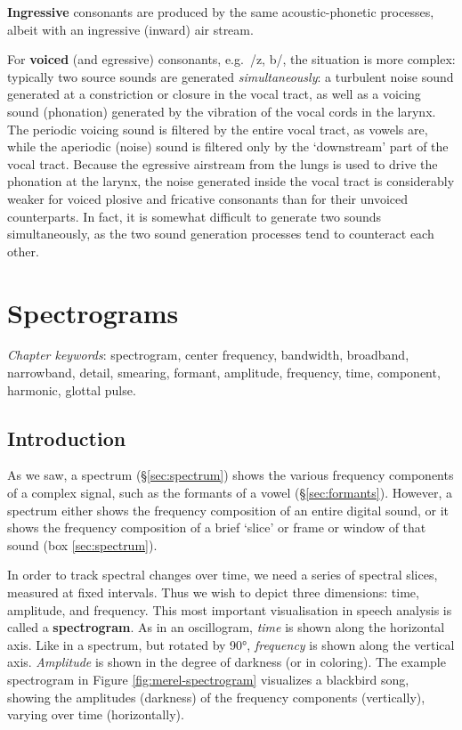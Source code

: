 \documentclass[
]{book}
\begin{document}
\textbf{Ingressive} consonants are produced by the same acoustic-phonetic processes, albeit with an ingressive (inward) air stream.

For \textbf{voiced} (and egressive) consonants, e.g.~/z, b/, the situation is more complex: typically two source sounds are generated \emph{simultaneously}: a turbulent noise sound generated at a constriction or closure in the vocal tract, as well as a voicing sound (phonation) generated by the vibration of the vocal cords in the larynx. The periodic voicing sound is filtered by the entire vocal tract, as vowels are, while the aperiodic (noise) sound is filtered only by the `downstream' part of the vocal tract.
Because the egressive airstream from the lungs is used to drive the phonation at the larynx, the noise generated inside the vocal tract is considerably weaker for voiced plosive and fricative consonants than for their unvoiced counterparts. In fact, it is somewhat difficult to generate two sounds simultaneously, as the two sound generation processes tend to counteract each other.

\chapter{Spectrograms}\label{ch-spectrograms}

\emph{Chapter keywords}: spectrogram, center frequency, bandwidth, broadband, narrowband, detail, smearing, formant, amplitude, frequency, time, component, harmonic, glottal pulse.

\section{Introduction}\label{sec:spectrogram-intro}

As we saw, a spectrum (§\ref{sec:spectrum}) shows the various frequency components of a complex signal, such as the formants of a vowel (§\ref{sec:formants}). However, a spectrum either shows the frequency composition of an entire digital sound, or it shows the frequency composition of a brief `slice' or frame or window of that sound (box \ref{sec:spectrum}).

In order to track spectral changes over time, we need a series of spectral slices, measured at fixed intervals. Thus we wish to depict three dimensions: time, amplitude, and frequency. This most important visualisation in speech analysis is called a \textbf{spectrogram}. As in an oscillogram, \emph{time} is shown along the horizontal axis. Like in a spectrum, but rotated by 90°, \emph{frequency} is shown along the vertical axis. \emph{Amplitude} is shown in the degree of darkness (or in coloring).
The example spectrogram in Figure \ref{fig:merel-spectrogram} visualizes a blackbird song, showing the amplitudes (darkness) of the frequency components (vertically), varying over time (horizontally).
\end{document}
